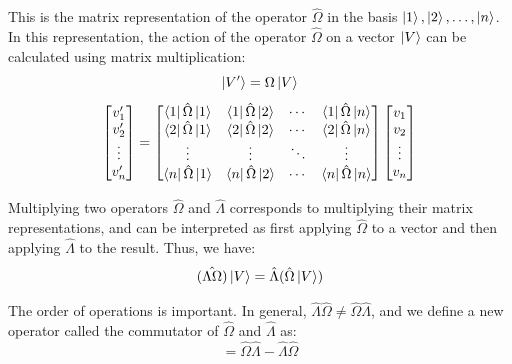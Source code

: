 \documentclass[12pt,a4paper]{report}
\begin{document}
This is the matrix representation of the operator $\hat{\Omega}$ in the basis $\ket{1}, \ket{2}, \ldots, \ket{n}$. In this representation, the action of the operator $\hat{\Omega}$ on a vector $\ket{V}$ can be calculated using matrix multiplication:
\begin{equation*}
    \ket{V'} = \Omega \ket{V}
\end{equation*}
\begin{equation*}
    \begin{bmatrix}
        v'_1 \\
        v'_2 \\
        \vdots \\
        v'_n
    \end{bmatrix}
    =
    \begin{bmatrix}
        \bra{1}\hat{\Omega}\ket{1} & \bra{1}\hat{\Omega}\ket{2} & \cdots & \bra{1}\hat{\Omega}\ket{n} \\
        \bra{2}\hat{\Omega}\ket{1} & \bra{2}\hat{\Omega}\ket{2} & \cdots & \bra{2}\hat{\Omega}\ket{n} \\
        \vdots & \vdots & \ddots & \vdots \\
        \bra{n}\hat{\Omega}\ket{1} & \bra{n}\hat{\Omega}\ket{2} & \cdots & \bra{n}\hat{\Omega}\ket{n}
    \end{bmatrix}
    \begin{bmatrix}
        v_1 \\
        v_2 \\
        \vdots \\
        v_n
    \end{bmatrix}
\end{equation*}

Multiplying two operators $\hat{\Omega}$ and $\hat{\Lambda}$ corresponds to multiplying their matrix representations, and can be interpreted as first applying $\hat{\Omega}$ to a vector and then applying $\hat{\Lambda}$ to the result. Thus, we have:
\begin{equation*}
    \hat{(\Lambda\Omega)} \ket{V} = \hat{\Lambda} (\hat{\Omega} \ket{V})
\end{equation*}

The order of operations is important. In general, $\hat{\Lambda}\hat{\Omega} \neq \hat{\Omega}\hat{\Lambda}$, and we define a new operator called the commutator of $\hat{\Omega}$ and $\hat{\Lambda}$ as:
\begin{equation*}
    [\hat{\Omega}, \hat{\Lambda}] = \hat{\Omega}\hat{\Lambda} - \hat{\Lambda}\hat{\Omega}
\end{equation*}
\end{document}
